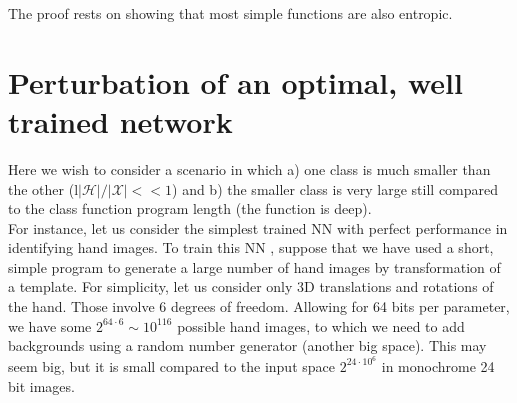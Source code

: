 \documentclass[11pt]{amsart}
\newcommand{\inputspace}{\mathcal X}
\newcommand{\handspace}{\mathcal H}
\begin{document}
The proof rests on showing that most simple functions are also  entropic.


\section{Perturbation of an optimal,  well trained    network}

Here we wish to consider a scenario in which a) one class is much smaller than the other (l$|\handspace|/|\inputspace| <<1$) and b) the smaller class is very large still compared to the class function program length (the function is deep). \\

For instance, let us consider the simplest  trained NN with perfect performance in identifying hand images. To train this NN%
, suppose that we have used a  short, simple program  to generate  a large number of  hand images by transformation of a template. For simplicity, let us consider only 3D translations and rotations of the hand. Those involve 6 degrees of freedom. Allowing for 64 bits per parameter, we have some $2^{64\cdot 6} \sim 10^{116}$ possible  hand images, to which we need to add backgrounds using a random number generator (another big space). This may seem big, but it is small compared to the input space  $2^{24\cdot 10^{6}}$ in monochrome 24 bit images.  \\ %
\\
\end{document}
